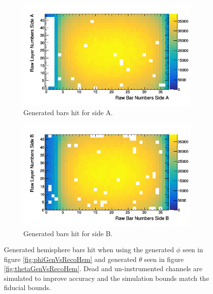 \begin{figure}[!h]
\centering
\begin{subfigure}{.5\textwidth}
  \centering
  \includegraphics[width=\linewidth]{Chapter5/Figs/Raster/rawHemisphereFiducialBarsSideA.png}
  \captionsetup{width=.9\linewidth}
  \caption{Generated bars hit for side A.}
  \label{subFig:rawHemisphereFiducialBarsSideA}
\end{subfigure}%
\begin{subfigure}{.5\textwidth}
  \centering
\includegraphics[width=\linewidth]{Chapter5/Figs/Raster/rawHemisphereFiducialBarsSideB.png}
  \captionsetup{width=.9\linewidth}
  \caption{Generated bars hit for side B.}
  \label{subFig:rawHemisphereFiducialBarsSideB}
\end{subfigure}
\caption{Generated hemisphere bars hit when using the generated $\phi$ seen in figure \ref{fig:phiGenVsRecoHem} and generated $\theta$ seen in figure \ref{fig:thetaGenVsRecoHem}. Dead and un-instrumented channels are simulated to improve accuracy and the simulation bounds match the fiducial bounds.}
\label{fig:rawHemisphereFiducialBarsSideAB}
\end{figure}

